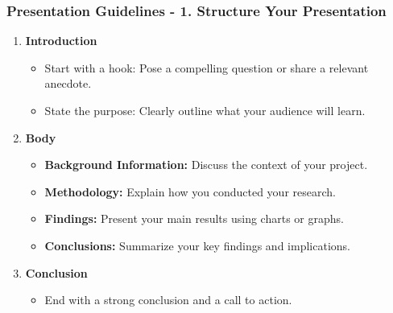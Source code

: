 \documentclass[aspectratio=169]{beamer}
\begin{document}
\begin{frame}[fragile]
    \frametitle{Presentation Guidelines - 1. Structure Your Presentation}
    \begin{enumerate}
        \item \textbf{Introduction}
            \begin{itemize}
                \item Start with a hook: Pose a compelling question or share a relevant anecdote.
                \item State the purpose: Clearly outline what your audience will learn.
            \end{itemize}
        \item \textbf{Body}
            \begin{itemize}
                \item \textbf{Background Information:} Discuss the context of your project.
                \item \textbf{Methodology:} Explain how you conducted your research.
                \item \textbf{Findings:} Present your main results using charts or graphs.
                \item \textbf{Conclusions:} Summarize your key findings and implications.
            \end{itemize}
        \item \textbf{Conclusion}
            \begin{itemize}
                \item End with a strong conclusion and a call to action.
            \end{itemize}
    \end{enumerate}
\end{frame}
\end{document}
